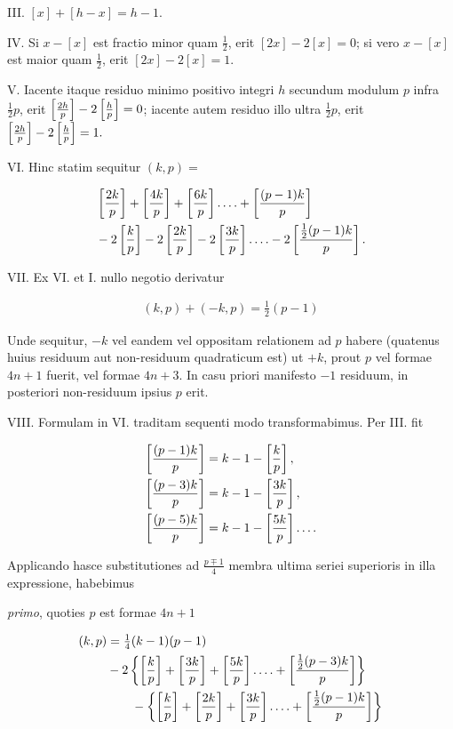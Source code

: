 III.  $[x]+[h-x]=h-1.$

IV.  Si $x-[x]$ est fractio minor quam $\tfrac12$, erit $[2x]-2[x]=0$; si vero $x-[x]$ est maior quam $\tfrac12$, erit $[2x]-2[x]=1.$

V.  Iacente itaque residuo minimo positivo integri $h$ secundum modulum $p$ infra $\tfrac12p$, erit $\left[\frac{2h}{p}\right]-2\left[\frac{h}{p}\right]=0$; iacente autem residuo illo ultra $\tfrac12p$, erit $\left[\frac{2h}{p}\right]-2\left[\frac{h}{p}\right]=1.$

%
VI.  Hinc statim sequitur $(k,p)=$

\[
\begin{aligned}
&\left[\frac{2k}{p}\right]+\left[\frac{4k}{p}\right]+\left[\frac{6k}{p}\right]\mathinner{.\,.\,.\,.}+\left[\frac{(p-1)k}{p}\right]\\
&-2\left[\frac{k}{p}\right]-2\left[\frac{2k}{p}\right]-2\left[\frac{3k}{p}\right]\mathinner{.\,.\,.\,.}-2\left[\frac{\frac12(p-1)k}{p}\right].
\end{aligned}
\]

VII.  Ex VI. et I. nullo negotio derivatur

\[
\begin{aligned}
(k,p)+(-k,p)=\tfrac12(p-1)
\end{aligned}
\]

Unde sequitur, $-k$ vel eandem vel oppositam relationem ad $p$ habere (quatenus huius residuum aut non-residuum quadraticum est) ut $+k$, prout $p$ vel formae $4n+1$ fuerit, vel formae $4n+3$.  In casu priori manifesto $-1$ residuum, in posteriori non-residuum ipsius $p$ erit.

VIII.  Formulam in VI. traditam sequenti modo transformabimus. Per III. fit

\[
\begin{aligned}
\left[\frac{(p-1)k}{p}\right]&=k-1-\left[\frac{k}{p}\right],\\
\left[\frac{(p-3)k}{p}\right]&=k-1-\left[\frac{3k}{p}\right],\\
\left[\frac{(p-5)k}{p}\right]&=k-1-\left[\frac{5k}{p}\right]\mathinner{.\,.\,.\,.}
\end{aligned}
\]

Applicando hasce substitutiones ad $\frac{p\mp1}{4}$ membra ultima seriei superioris in illa expressione, habebimus

\emph{primo}, quoties $p$ est formae $4n+1$

\[
\begin{aligned}
(k,p)&=\tfrac14(k-1)(p-1)\\
& -2\left\{\left[\frac{k}{p}\right]+\left[\frac{3k}{p}\right]+\left[\frac{5k}{p}\right]\mathinner{.\,.\,.\,.}+\left[\frac{\frac12(p-3)k}{p}\right]\right\}\\
&\qquad-\left\{\left[\frac{k}{p}\right]+\left[\frac{2k}{p}\right]+\left[\frac{3k}{p}\right]\mathinner{.\,.\,.\,.}+\left[\frac{\frac12(p-1)k}{p}\right]\right\}
\end{aligned}
\]

